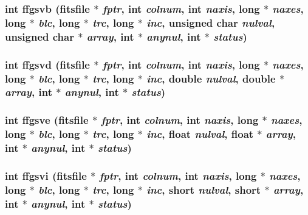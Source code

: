 \subsubsection{\setlength{\rightskip}{0pt plus 5cm}int ffgsvb (\bf{fitsfile} $\ast$ {\em fptr}, int {\em colnum}, int {\em naxis}, long $\ast$ {\em naxes}, long $\ast$ {\em blc}, long $\ast$ {\em trc}, long $\ast$ {\em inc}, unsigned char {\em nulval}, unsigned char $\ast$ {\em array}, int $\ast$ {\em anynul}, int $\ast$ {\em status})}\label{fitsio__64_8h_83da0d68b492ed457e64f01e1dfad807}


\subsubsection{\setlength{\rightskip}{0pt plus 5cm}int ffgsvd (\bf{fitsfile} $\ast$ {\em fptr}, int {\em colnum}, int {\em naxis}, long $\ast$ {\em naxes}, long $\ast$ {\em blc}, long $\ast$ {\em trc}, long $\ast$ {\em inc}, double {\em nulval}, double $\ast$ {\em array}, int $\ast$ {\em anynul}, int $\ast$ {\em status})}\label{fitsio__64_8h_d7a1005a5c7e8f1f436eac3d8e5d837d}


\subsubsection{\setlength{\rightskip}{0pt plus 5cm}int ffgsve (\bf{fitsfile} $\ast$ {\em fptr}, int {\em colnum}, int {\em naxis}, long $\ast$ {\em naxes}, long $\ast$ {\em blc}, long $\ast$ {\em trc}, long $\ast$ {\em inc}, float {\em nulval}, float $\ast$ {\em array}, int $\ast$ {\em anynul}, int $\ast$ {\em status})}\label{fitsio__64_8h_caea21eb62f053c04e29d9fe6706e7ee}


\subsubsection{\setlength{\rightskip}{0pt plus 5cm}int ffgsvi (\bf{fitsfile} $\ast$ {\em fptr}, int {\em colnum}, int {\em naxis}, long $\ast$ {\em naxes}, long $\ast$ {\em blc}, long $\ast$ {\em trc}, long $\ast$ {\em inc}, short {\em nulval}, short $\ast$ {\em array}, int $\ast$ {\em anynul}, int $\ast$ {\em status})}\label{fitsio__64_8h_f6fc8403f2e424f4940ccbb2ef1f13c5}


